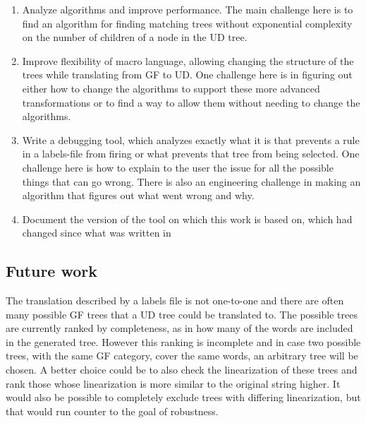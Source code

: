 
\begin{enumerate}
    \item 
Analyze algorithms and improve performance. The main challenge here is to find an algorithm for finding matching trees without exponential complexity on the number of children of a node in the UD tree.

\item
Improve flexibility of macro language, allowing changing the structure of the trees while translating from GF to UD. One challenge here is in figuring out either how to change the algorithms to support these more advanced transformations or to find a way to allow them without needing to change the algorithms.
\item
 Write a debugging tool, which analyzes exactly what it is that prevents a rule in a labels-file from firing or what prevents that tree from being selected.
One challenge here is how to explain to the user the issue for all the possible things that can go wrong.
There is also an engineering challenge in making an algorithm that figures out what went wrong and why.

\item
 Document the version of the tool on which this work is based on, which had changed since what was written in \cite{kolachina-ranta-2017}
\end{enumerate}

\subsection{Future work}

The translation described by a labels file is not one-to-one and there are often many possible GF trees that a UD tree could be translated to. The possible trees are currently ranked by completeness, as in how many of the words are included in the generated tree. However this ranking is incomplete and in case two possible trees, with the same GF category, cover the same words, an arbitrary tree will be chosen. A better choice could be to also check the linearization of these trees and rank those whose linearization is more similar to the original string higher. It would also be possible to completely exclude trees with differing linearization, but that would run counter to the goal of robustness.


